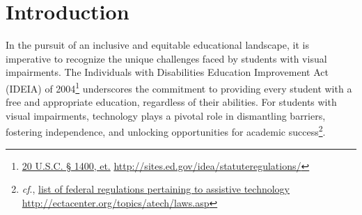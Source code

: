 \documentclass[12pt,letterpaper,twoside]{extreport}
\title{\Huge ENHANCING EDUCATIONAL EQUITY: \vskip2em \Large A Comprehensive Exploration of Technology Needs for Students with Visual Impairments}
\author{Michael Ryan Hunsaker, M.Ed., Ph.D.}
\date{\vfill \textit{Last Updated: {\today}}}
\renewcommand{\cftchapleader}{\cftdotfill{\cftdotsep}}
\begin{document}
\raggedbottom
\raggedright
{}
\maketitle
{}
\dominitoc
\setcounter{minitocdepth}{1}
\setcounter{tocdepth}{1}
\cleardoublepage
\fancyhead{}
\fancyfoot{}
\tableofcontents
{}
\listoffigures
{}
\listoftables
\newpage{}
\fancyhead{}
\fancyfoot{}

\hypertarget{intro}{}\chapter*{Introduction}\label{intro}
\renewcommand{\cftchapleader}{\cftdotfill{\cftdotsep}}
\pagestyle{fancyplain}
\fancyfoot[C]{\thepage}
In the pursuit of an inclusive and equitable educational landscape, it is imperative to recognize the unique challenges faced by students with visual impairments. The Individuals with Disabilities Education Improvement Act (IDEIA) of 2004\footnote{\raggedright \href{http://sites.ed.gov/idea/statuteregulations/}{20 U.S.C. § 1400, et.} \url{http://sites.ed.gov/idea/statuteregulations/}} underscores the commitment to providing every student with a free and appropriate education, regardless of their abilities. For students with visual impairments, technology plays a pivotal role in dismantling barriers, fostering independence, and unlocking opportunities for academic success\footnote{\raggedright \textit{cf}., \href{http://ectacenter.org/topics/atech/laws.asp}{list of federal regulations pertaining to assistive technology} \hfill\break\url{http://ectacenter.org/topics/atech/laws.asp}}.
\end{document}
